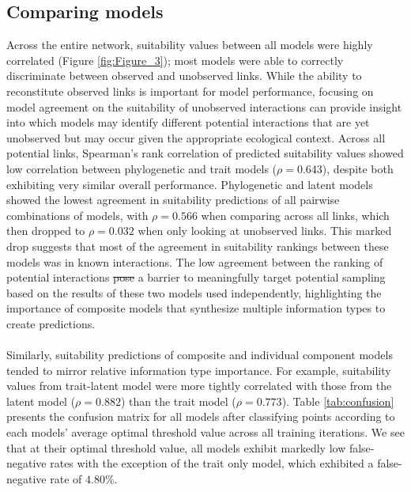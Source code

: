 \documentclass[num-refs]{article}%
\providecommand{\DIFadd}[1]{{\protect\color{blue}\uwave{#1}}} %
\providecommand{\DIFdel}[1]{{\protect\color{red}\sout{#1}}}                      %
\providecommand{\DIFaddbegin}{} %
\providecommand{\DIFaddend}{} %
\providecommand{\DIFdelbegin}{} %
\providecommand{\DIFdelend}{} %
\newcommand{\DIFscaledelfig}{0.5}
\newlength{\DIFdelgraphicswidth} %
\newlength{\DIFdelgraphicsheight} %
\newcommand{\DIFaddincludegraphics}[2][]{{\color{blue}\fbox{\DIFOincludegraphics[#1]{#2}}}} %
\newcommand{\DIFdelincludegraphics}[2][]{%
\sbox{\DIFdelgraphicsbox}{\DIFOincludegraphics[#1]{#2}}%
\settoboxwidth{\DIFdelgraphicswidth}{\DIFdelgraphicsbox} %
\settoboxtotalheight{\DIFdelgraphicsheight}{\DIFdelgraphicsbox} %
\scalebox{\DIFscaledelfig}{%
\parbox[b]{\DIFdelgraphicswidth}{\usebox{\DIFdelgraphicsbox}\\[-\baselineskip] \rule{\DIFdelgraphicswidth}{0em}}\llap{\resizebox{\DIFdelgraphicswidth}{\DIFdelgraphicsheight}{%
\setlength{\unitlength}{\DIFdelgraphicswidth}%
\begin{picture}(1,1)%
\thicklines\linethickness{2pt} %
{\color[rgb]{1,0,0}\put(0,0){\framebox(1,1){}}}%
{\color[rgb]{1,0,0}\put(0,0){\line( 1,1){1}}}%
{\color[rgb]{1,0,0}\put(0,1){\line(1,-1){1}}}%
\end{picture}%
}\hspace*{3pt}}} %
} %
\DeclareRobustCommand{\DIFaddbegin}{\DIFOaddbegin \let\includegraphics\DIFaddincludegraphics} %
\DeclareRobustCommand{\DIFaddend}{\DIFOaddend \let\includegraphics\DIFOincludegraphics} %
\DeclareRobustCommand{\DIFdelbegin}{\DIFOdelbegin \let\includegraphics\DIFdelincludegraphics} %
\DeclareRobustCommand{\DIFdelend}{\DIFOaddend \let\includegraphics\DIFOincludegraphics} %
\begin{document}
\subsection*{Comparing models}
Across the entire network, suitability values between all models were highly correlated (Figure \ref{fig:Figure_3}); most models were able to correctly discriminate between observed and unobserved links. While the ability to reconstitute observed links is important for model performance, focusing on model agreement on the suitability of unobserved interactions can provide insight into which models may identify different potential interactions that are yet unobserved but may occur given the appropriate ecological context. Across all potential links, Spearman's rank correlation of predicted suitability values showed low correlation between phylogenetic and trait models ($\rho = 0.643$), despite both exhibiting very similar overall performance. Phylogenetic and latent models showed the lowest agreement in suitability predictions of all pairwise combinations of models, with $\rho = 0.566$ when comparing across all links,  which then dropped to $\rho = 0.032$ when only looking at unobserved links. This marked drop suggests that most of the agreement in suitability rankings between these models was in known interactions. The low agreement between the ranking of potential interactions \DIFdelbegin \DIFdel{pose }\DIFdelend \DIFaddbegin \DIFadd{poses }\DIFaddend a barrier to meaningfully target potential sampling based on the results of these two models used independently, highlighting the importance of composite models that synthesize multiple information types to create predictions. 


\paragraph*{}
Similarly, suitability predictions of composite and individual component models tended to mirror relative information type importance. For example, suitability values from \DIFaddbegin \DIFadd{the }\DIFaddend trait-latent model were more tightly correlated with those from the latent model ($\rho=0.882$) than the trait model ($\rho=0.773$). Table \ref{tab:confusion} presents the confusion matrix for all models after classifying points according to each models' average optimal threshold value across all training iterations. We see that at their optimal threshold value, all models exhibit markedly low false-negative rates with the exception of the trait only model, which exhibited a false-negative rate of $4.80\%$.
\end{document}
